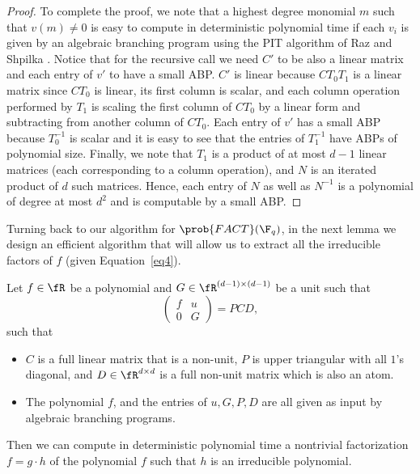 \begin{proof}
  To complete the proof, we note that a highest degree monomial $m$
  such that $v(m)\ne 0$ is easy to compute in deterministic polynomial
  time if each $v_i$ is given by an algebraic branching program using
  the PIT algorithm of Raz and Shpilka \cite{RS05}. Notice that for
  the recursive call we need $C'$ to be also a linear matrix and each
  entry of $v'$ to have a small ABP. $C'$ is linear because $CT_0T_1$
  is a linear matrix since $CT_0$ is linear, its first column is
  scalar, and each column operation performed by $T_1$ is scaling the
  first column of $CT_0$ by a linear form and subtracting from another
  column of $CT_0$. Each entry of $v'$ has a small ABP because
  $T_0^{-1}$ is scalar and it is easy to see that the entries of
  $T_1^{-1}$ have ABPs of polynomial size. Finally, we note that $T_1$
  is a product of at most $d-1$ linear matrices (each corresponding to
  a column operation), and $N$ is an iterated product of $d$ such
  matrices. Hence, each entry of $N$ as well as $N^{-1}$ is a
  polynomial of degree at most $d^2$ and is computable by a small ABP.


  
\end{proof}

%
%
%
%

Turning back to our algorithm for $\prob{FACT}(\F_q)$, in the next
lemma we design an efficient algorithm that will allow us to extract
all the irreducible factors of $f$ (given Equation~\ref{eq4}).

\begin{lemma}\label{extract}
  Let $f\in\fR$ be a polynomial and $G\in\fR^{(d-1)\times (d-1)}$ be a
  unit such that
  \begin{equation}\label{eq5}
  \left(
\begin{array}{cc}
f & u \\
0 & G
\end{array}
\right)
= P CD,
\end{equation}
such that
\begin{itemize}
\item $C$ is a full linear matrix that is a non-unit, $P$ is upper
  triangular with all $1$'s diagonal, and $D\in\fR^{d\times d}$ is a
  full non-unit matrix which is also an atom.
\item The polynomial $f$, and the entries of $u, G, P, D$ are all
  given as input by algebraic branching programs.
\end{itemize}
Then we can compute in deterministic polynomial time a nontrivial
factorization $f=g\cdot h$ of the polynomial $f$ such that $h$ is an
irreducible polynomial.
\end{lemma}

